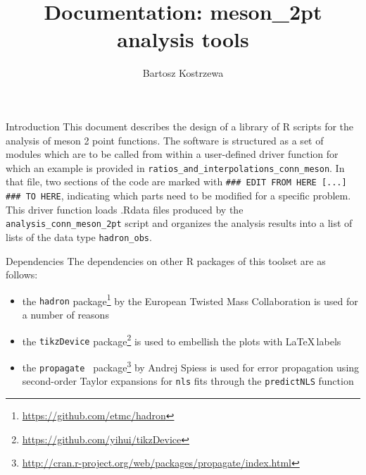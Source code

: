 \documentclass[10pt,a5paper]{article}
\author{Bartosz Kostrzewa}
\title{Documentation: meson\_2pt analysis tools}
\begin{document}
\maketitle

\begin{section}{Introduction}
This document describes the design of a library of R scripts for the analysis of meson 2 point functions. The software is structured as a set of modules which are to be called from within a user-defined driver function for which an example is provided in \verb|ratios_and_interpolations_conn_meson|.
In that file, two sections of the code are marked with \verb|### EDIT FROM HERE [...] ### TO HERE|, indicating which parts need to be modified for a specific problem.
This driver function loads .Rdata files produced by the \verb|analysis_conn_meson_2pt| script and organizes the analysis results into a list of lists of the data type \verb|hadron_obs|.
\end{section} %

\begin{section}{Dependencies}
 The dependencies on other R packages of this toolset are as follows:
\begin{itemize}
  \item the {\tt hadron} package\footnote{\url{https://github.com/etmc/hadron}} by the European Twisted Mass Collaboration is used for a number of reasons
  \item the {\tt tikzDevice} package\footnote{\url{https://github.com/yihui/tikzDevice}} is used to embellish the plots with \LaTeX\,labels
  \item the {\tt propagate } package\footnote{\url{http://cran.r-project.org/web/packages/propagate/index.html}} by Andrej Spiess is used for error propagation using second-order Taylor expansions for {\tt nls} fits through the {\tt predictNLS} function
\end{itemize}

\end{section} %
\end{document}
